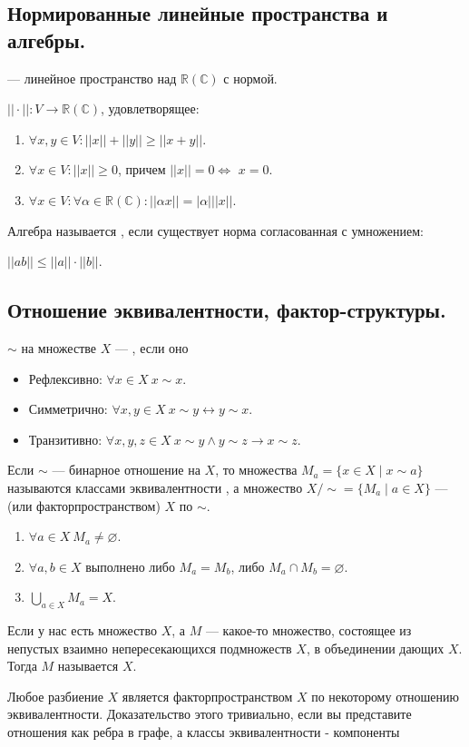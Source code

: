 \subsection{Нормированные линейные пространства и алгебры.}

 --- линейное пространство над $\mathbb{R}(\mathbb{C})$ с нормой.

 $||\cdot||:V \rightarrow \mathbb{R}(\mathbb{C})$, удовлетворящее:

\begin{enumerate}
    \item $\forall x, y \in V : ||x|| + ||y||\geq ||x+y||$.
    \item $\forall x \in V : ||x||\geq 0$, причем $||x||=0 \Leftrightarrow$ $x = 0$.
    \item $\forall x \in V : \forall \alpha \in \mathbb{R}(\mathbb{C}) : ||\alpha x|| = |\alpha|||x||$.
\end{enumerate}

Алгебра называется , если существует норма согласованная с умножением:

$||ab||\leq ||a|| \cdot ||b||$.

\subsection{Отношение эквивалентности, фактор-структуры.}



 $\sim$ на множестве $X$ --- , если оно
\begin{itemize}
    \item Рефлексивно: $\forall x\in X~x\sim x$.
    \item Симметрично: $\forall x,y\in X~x\sim y\leftrightarrow y\sim x$.
    \item Транзитивно: $\forall x,y,z\in X~x\sim y\land y\sim z\rightarrow x\sim z$.
\end{itemize}
Если $\sim$ --- бинарное отношение на $X$, то множества $M_a=\{x\in X\mid x\sim a\}$ называются классами эквивалентности , а множество $X/\sim=\{M_a\mid a\in X\}$ ---  (или {факторпространством}) $X$ по $\sim$.

\begin{enumerate}
    \item $\forall a\in X~M_a\neq\varnothing$.
    \item $\forall a,b\in X$ выполнено либо $M_a=M_b$, либо $M_a\cap M_b=\varnothing$.
    \item $\bigcup\limits_{a\in X}M_a=X$.
\end{enumerate}

Если у нас есть множество $X$, а $M$ --- какое-то множество, состоящее из непустых взаимно непересекающихся подмножеств $X$, в объединении дающих $X$. Тогда $M$ называется  $X$.


Любое разбиение $X$ является факторпространством $X$ по некоторому отношению эквивалентности. Доказательство этого тривиально, если вы представите отношения как ребра в графе, а классы эквивалентности - компоненты



